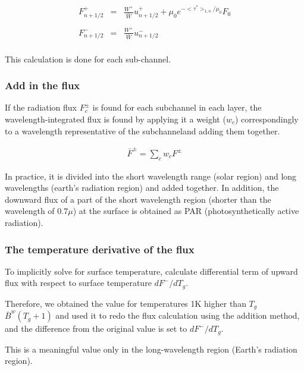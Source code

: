 \begin{eqnarray}
  F^+_{n+1/2} & = & \frac{W^+}{\bar{W}} u^+_{n+1/2} 
                + \mu_0 e^{-<\tau^*>_{1,n}/\mu_0} F_0 \\\\
  F^-_{n+1/2} & = & \frac{W^+}{\bar{W}} u^-_{n+1/2} \\
\end{eqnarray}


This calculation is done for each sub-channel.

\hypertarget{add-in-the-flux}{%
\subsubsection{Add in the flux}\label{add-in-the-flux}}

If the radiation flux \(F^\pm_c\) is found for each subchannel in each
layer,  the wavelength-integrated flux is found by applying it a weight (\(w_c\)) correspondingly to a wavelength representative of the
subchanneland adding them together.

\begin{eqnarray}
  \bar{F}^\pm = \sum_c w_c F^\pm
\end{eqnarray}

In practice, it is divided into the short wavelength range (solar region) and 
long wavelengths (earth's radiation region) and added together. 
In addition, the downward flux of a part of the short wavelength region (shorter than the wavelength of \(0.7\mu\)) at the surface is obtained
as PAR (photosynthetically active radiation).

\hypertarget{the-temperature-derivative-of-the-flux}{%
\subsubsection{The temperature derivative of the
flux}\label{the-temperature-derivative-of-the-flux}}

To implicitly solve for surface temperature, calculate differential term of
upward flux with respect to surface temperature \(dF^-/dT_g\). 

Therefore, we obtained the value for temperatures 1K higher than
\(T_g\) \(\overline{B}^w(T_g+1)\) and used it to redo
the flux calculation using the addition method, and the difference from the
original value is set to \(dF^-/dT_g\). 

This is a meaningful value only
in the long-wavelength region (Earth's radiation region).

